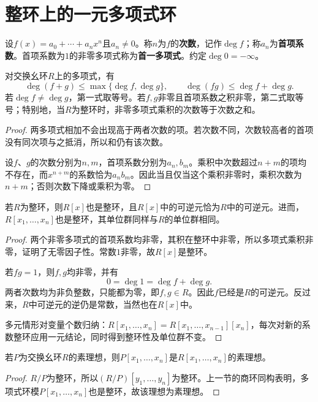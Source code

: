 \section{整环上的一元多项式环}

\begin{definition}
设$f(x)=a_0+\cdots+a_nx^n$且$a_n\ne0$。称$n$为$f$的\textbf{次数}，记作$\deg f$；称$a_n$为\textbf{首项系数}。首项系数为$1$的非零多项式称为\textbf{首一多项式}。约定$\deg0=-\infty$。
\end{definition}

\begin{proposition}
对交换幺环$R$上的多项式，有
\[
\deg(f+g)\le\max\{\deg f,\deg g\},\qquad
\deg(fg)\le\deg f+\deg g.
\]
若$\deg f\ne\deg g$，第一式取等号。若$f,g$非零且首项系数之积非零，第二式取等号；特别地，当$R$为整环时，非零多项式乘积的次数等于次数之和。
\end{proposition}
\begin{proof}
两多项式相加不会出现高于两者次数的项。若次数不同，次数较高者的首项没有同次项与之抵消，所以和仍有该次数。

设$f$、$g$的次数分别为$n,m$，首项系数分别为$a_n,b_m$。乘积中次数超过$n+m$的项均不存在，而$x^{n+m}$的系数恰为$a_nb_m$。因此当且仅当这个乘积非零时，乘积次数为$n+m$；否则次数下降或乘积为零。
\end{proof}

\begin{proposition}
若$R$为整环，则$R[x]$也是整环，且$R[x]$中的可逆元恰为$R$中的可逆元。进而，$R[x_1,\ldots,x_n]$也是整环，其单位群同样与$R$的单位群相同。
\end{proposition}
\begin{proof}
两个非零多项式的首项系数均非零，其积在整环中非零，所以多项式乘积非零，证明了无零因子性。常数$1$非零，故$R[x]$是整环。

若$fg=1$，则$f,g$均非零，并有
\[
0=\deg1=\deg f+\deg g.
\]
两者次数均为非负整数，只能都为零，即$f,g\in R$。因此$f$已经是$R$的可逆元。反过来，$R$中可逆元的逆仍是常数，当然也在$R[x]$中。

多元情形对变量个数归纳：$R[x_1,\ldots,x_n]=R[x_1,\ldots,x_{n-1}][x_n]$，每次对新的系数整环应用一元结论，同时得到整环性及单位群不变。
\end{proof}

\begin{corollary}
若$P$为交换幺环$R$的素理想，则$P[x_1,\ldots,x_n]$是$R[x_1,\ldots,x_n]$的素理想。
\end{corollary}
\begin{proof}
$R/P$为整环，所以$(R/P)[y_1,\ldots,y_n]$为整环。上一节的商环同构表明，多项式环模$P[x_1,\ldots,x_n]$也是整环，故该理想为素理想。
\end{proof}

